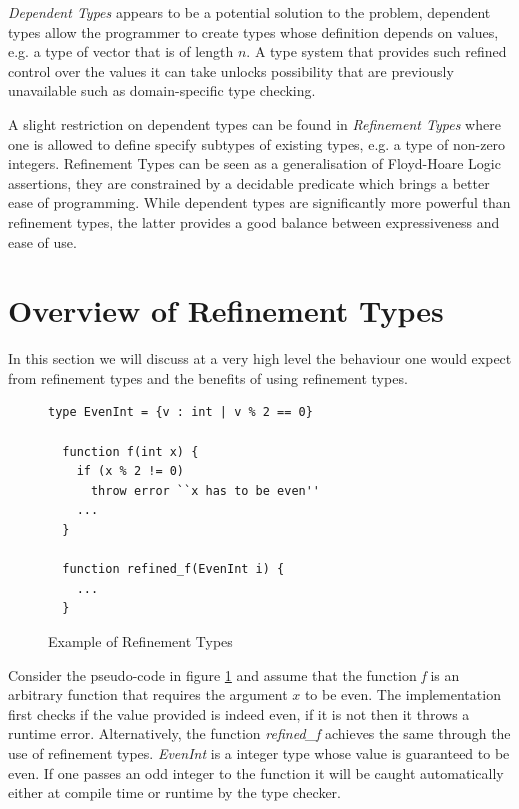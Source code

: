 \documentclass[a4paper,12pt]{report}
\begin{document}
\par
\textit{Dependent Types} \cite{depenTypeAtWork} appears to be a potential solution 
to the problem, dependent types allow the programmer to create types whose 
definition depends on values, e.g. a type of vector that is of length $n$. 
A type system that provides such refined control over the values it 
can take unlocks possibility that are previously unavailable such as 
domain-specific type checking.

\par
A slight restriction on dependent types can be found in \textit{Refinement 
Types} \cite{refinementTypes} where one is allowed to define specify subtypes 
of existing types, e.g. a type of non-zero integers. Refinement Types can be 
seen as a generalisation of Floyd-Hoare Logic \cite{localRefTyping} assertions,  
they are constrained by a decidable predicate which brings a 
better ease of programming. While dependent types are significantly 
more powerful than refinement types, the latter provides a good balance between 
expressiveness and ease of use.

\section{Overview of Refinement Types}
In this section we will discuss at a very high level the behaviour one would 
expect from refinement types and the benefits of using refinement types. 

\begin{figure}[h] 
  \begin{lstlisting}[mathescape=true] 
  type EvenInt = {v : int | v % 2 == 0}
  
  function f(int x) {
    if (x % 2 != 0) 
      throw error ``x has to be even''
    ...
  }
  
  function refined_f(EvenInt i) {
    ...
  }
  \end{lstlisting}
  \caption{Example of Refinement Types}
  \label{code:refine}
\end{figure}

\par
Consider the pseudo-code in figure \ref{code:refine} and assume that the function 
\textit{f} is an arbitrary function that requires the argument $x$ to be even.
The implementation first checks if the value provided is indeed even, if it 
is not then it throws a runtime error. Alternatively, the function \textit{refined\_f} 
achieves the same through the use of refinement types. \textit{EvenInt} is a 
integer type whose value is guaranteed to be even. If one passes an odd integer 
to the function it will be caught automatically either at compile time or 
runtime by the type checker. 
\end{document}
